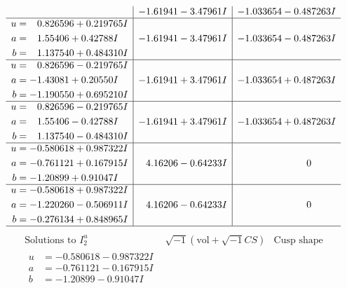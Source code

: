 \documentclass[1p]{elsarticle_modified}
\theoremstyle{definition}
\newcommand{\I}{\sqrt{-1}}
\begin{document}
$$\begin{array}{c|c|c}
 & -1.61941 - 3.47961 I & -1.033654 - 0.487263 I \\ \hline\begin{aligned}
u &= \phantom{-}0.826596 + 0.219765 I \\
a &= \phantom{-}1.55406 + 0.42788 I \\
b &= \phantom{-}1.137540 + 0.484310 I\end{aligned}
 & -1.61941 - 3.47961 I & -1.033654 - 0.487263 I \\ \hline\begin{aligned}
u &= \phantom{-}0.826596 - 0.219765 I \\
a &= -1.43081 + 0.20550 I \\
b &= -1.190550 + 0.695210 I\end{aligned}
 & -1.61941 + 3.47961 I & -1.033654 + 0.487263 I \\ \hline\begin{aligned}
u &= \phantom{-}0.826596 - 0.219765 I \\
a &= \phantom{-}1.55406 - 0.42788 I \\
b &= \phantom{-}1.137540 - 0.484310 I\end{aligned}
 & -1.61941 + 3.47961 I & -1.033654 + 0.487263 I \\ \hline\begin{aligned}
u &= -0.580618 + 0.987322 I \\
a &= -0.761121 + 0.167915 I \\
b &= -1.20899 + 0.91047 I\end{aligned}
 & \phantom{-}4.16206 - 0.64233 I & \phantom{-0.000000 } 0 \\ \hline\begin{aligned}
u &= -0.580618 + 0.987322 I \\
a &= -1.220260 - 0.506911 I \\
b &= -0.276134 + 0.848965 I\end{aligned}
 & \phantom{-}4.16206 - 0.64233 I & \phantom{-0.000000 } 0\\
 \hline 
 \end{array}$$\newpage$$\begin{array}{c|c|c}  
\text{Solutions to }I^u_{2}& \I (\text{vol} + \sqrt{-1}CS) & \text{Cusp shape}\\
 \hline 
\begin{aligned}
u &= -0.580618 - 0.987322 I \\
a &= -0.761121 - 0.167915 I \\
b &= -1.20899 - 0.91047 I\end{aligned}

\end{array}$$
\end{document}
